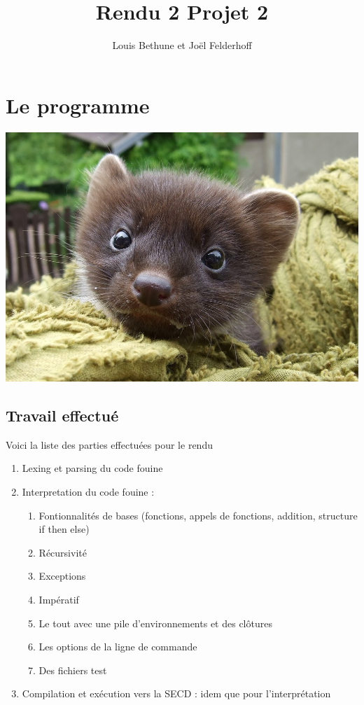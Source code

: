 \documentclass[a4paper,10pt]{report}
\title{Rendu 2 Projet 2}
\author{Louis Bethune et Jo\"el Felderhoff}
\date{}
\begin{document}
\maketitle

\chapter*{Le programme}

\begin{center}
\includegraphics[scale=0.25]{fouine.jpg} 
\end{center}

\section{Travail effectué}
Voici la liste des parties effectuées pour le rendu
\begin{enumerate}

\item Lexing et parsing du code fouine
\item Interpretation du code fouine :
\begin{enumerate}
	\item Fontionnalités de bases (fonctions, appels de fonctions, addition, structure if then else)
	\item Récursivité
	\item Exceptions
	\item Impératif
	\item Le tout avec une pile d'environnements et des clôtures
	\item Les options de la ligne de commande
	\item Des fichiers test
\end{enumerate}
\item Compilation et exécution vers la SECD : idem que pour l'interprétation
\end{enumerate}
\end{document}
